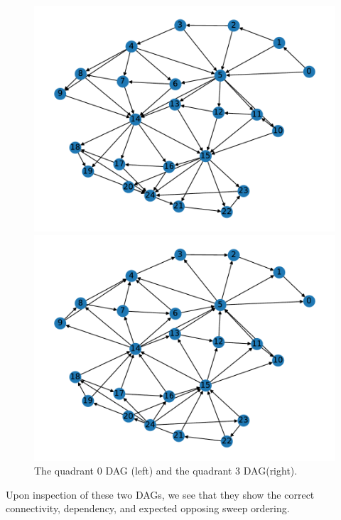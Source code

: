 \begin{figure}[H]
\begin{minipage}[c]{0.5\textwidth}
\includegraphics[scale=0.55]{../../figures/25_graph0.pdf}
\end{minipage}
\begin{minipage}[c]{0.5\textwidth}
\includegraphics[scale=0.55]{../../figures/25_graph3.pdf}
\end{minipage}
\caption{The quadrant 0 DAG (left) and the quadrant 3 DAG(right).}
\label{25_q0q3graphs}
\end{figure}
Upon inspection of these two DAGs, we see that they show the correct connectivity, dependency, and expected opposing sweep ordering. 

